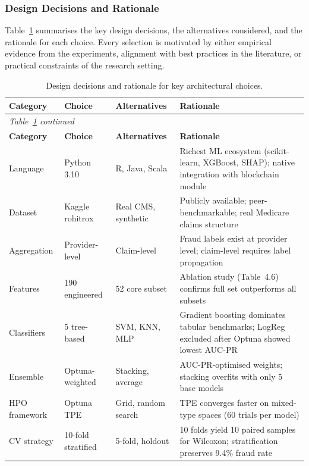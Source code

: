 \begin{enumerate}[label=\roman*.]
\end{enumerate}

\subsubsection{Design Decisions and Rationale}
Table~\ref{tab:design} summarises the key design decisions, the alternatives considered, and the rationale for each choice. Every selection is motivated by either empirical evidence from the experiments, alignment with best practices in the literature, or practical constraints of the research setting.

\begin{longtable}{p{2.8cm} p{3cm} p{2.8cm} p{5cm}}
\caption{Design decisions and rationale for key architectural choices.} \label{tab:design} \\
\toprule
\textbf{Category} & \textbf{Choice} & \textbf{Alternatives} & \textbf{Rationale} \\
\midrule
\endfirsthead
\multicolumn{4}{l}{\textit{Table~\ref{tab:design} continued}} \\
\toprule
\textbf{Category} & \textbf{Choice} & \textbf{Alternatives} & \textbf{Rationale} \\
\midrule
\endhead
\bottomrule
\endfoot
Language & Python 3.10 & R, Java, Scala & Richest ML ecosystem (scikit-learn, XGBoost, SHAP); native integration with blockchain module \\
Dataset & Kaggle rohitrox & Real CMS, synthetic & Publicly available; peer-benchmarkable; real Medicare claims structure \\
Aggregation & Provider-level & Claim-level & Fraud labels exist at provider level; claim-level requires label propagation \\
Features & 190 engineered & 52 core subset & Ablation study (Table~4.6) confirms full set outperforms all subsets \\
Classifiers & 5 tree-based & SVM, KNN, MLP & Gradient boosting dominates tabular benchmarks; LogReg excluded after Optuna showed lowest AUC-PR \\
Ensemble & Optuna-weighted & Stacking, average & AUC-PR-optimised weights; stacking overfits with only 5 base models \\
HPO framework & Optuna TPE & Grid, random search & TPE converges faster on mixed-type spaces (60 trials per model) \\
CV strategy & 10-fold stratified & 5-fold, holdout & 10 folds yield 10 paired samples for Wilcoxon; stratification preserves 9.4\% fraud rate \\

\end{longtable}
